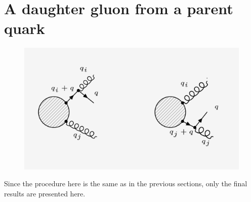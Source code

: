 \section{A daughter gluon from a parent quark}
\begin{figure}[ht!]
\centering
\includegraphics[scale=0.8]{images/GQ/GQDiagrams.png}
\end{figure}
Since the procedure here is the same as in the previous sections, only the final results are presented here.


%
%
%

